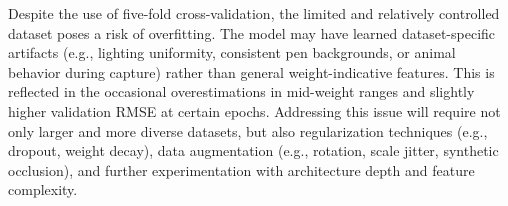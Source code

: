 Despite the use of five-fold cross-validation, the limited and relatively controlled dataset poses a risk of overfitting. The model may have learned dataset-specific artifacts (e.g., lighting uniformity, consistent pen backgrounds, or animal behavior during capture) rather than general weight-indicative features. This is reflected in the occasional overestimations in mid-weight ranges and slightly higher validation RMSE at certain epochs. Addressing this issue will require not only larger and more diverse datasets, but also regularization techniques (e.g., dropout, weight decay), data augmentation (e.g., rotation, scale jitter, synthetic occlusion), and further experimentation with architecture depth and feature complexity.



